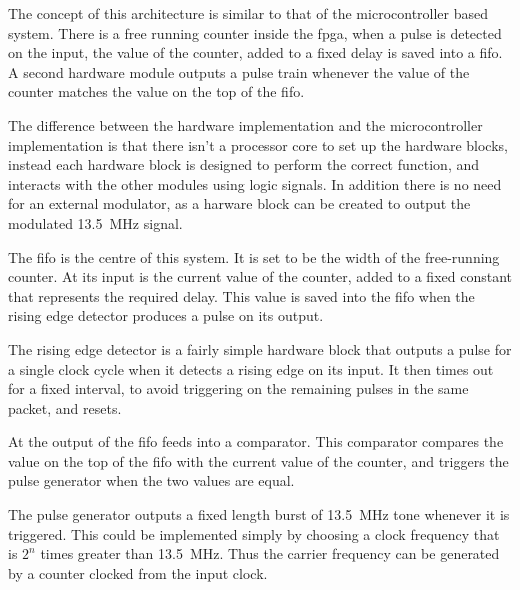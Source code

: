 The concept of this architecture is similar to that of the microcontroller based system. There is a free running counter inside the \gls{fpga}, when a pulse is detected on the input, the value of the counter, added to a fixed delay is saved into a \gls{fifo}. A second hardware module outputs a pulse train whenever the value of the counter matches the value on the top of the \gls{fifo}.

The difference between the hardware implementation and the microcontroller implementation is that there isn't a processor core to set up the hardware blocks, instead each hardware block is designed to perform the correct function, and interacts with the other modules using logic signals. In addition there is no need for an external modulator, as a harware block can be created to output the modulated \SI{13.5}{\mega\hertz} signal.

The \gls{fifo} is the centre of this system. It is set to be the width of the free-running counter. At its input is the current value of the counter, added to a fixed constant that represents the required delay. This value is saved into the \gls{fifo} when the rising edge detector produces a pulse on its output.

The rising edge detector is a fairly simple hardware block that outputs a pulse for a single clock cycle when it detects a rising edge on its input. It then times out for a fixed interval, to avoid triggering on the remaining pulses in the same packet, and resets.

At the output of the \gls{fifo} feeds into a comparator. This comparator compares the value on the top of the \gls{fifo} with the current value of the counter, and triggers the pulse generator when the two values are equal.

The pulse generator outputs a fixed length burst of \SI{13.5}{\mega\hertz} tone whenever it is triggered. This could be implemented simply by choosing a clock frequency that is $2^n$ times greater than \SI{13.5}{\mega\hertz}. Thus the carrier frequency can be generated by a counter clocked from the input clock.

